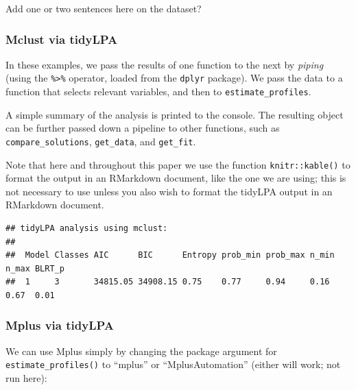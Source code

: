 \documentclass[man]{apa6}
\newenvironment{Shaded}{\begin{snugshade}}{\end{snugshade}}
\newcommand{\DecValTok}[1]{\textcolor[rgb]{0.00,0.00,0.81}{#1}}
\newcommand{\KeywordTok}[1]{\textcolor[rgb]{0.13,0.29,0.53}{\textbf{#1}}}
\newcommand{\NormalTok}[1]{#1}
\newcommand{\OperatorTok}[1]{\textcolor[rgb]{0.81,0.36,0.00}{\textbf{#1}}}
\newcommand{\StringTok}[1]{\textcolor[rgb]{0.31,0.60,0.02}{#1}}
\begin{document}
Add one or two sentences here on the dataset?

\hypertarget{mclust-via-tidylpa}{%
\subsubsection{Mclust via tidyLPA}\label{mclust-via-tidylpa}}

In these examples, we pass the results of one function to the next by \emph{piping}
(using the \texttt{\%\textgreater{}\%} operator, loaded from the \texttt{dplyr} package). We pass the data to
a function that selects relevant variables, and then to \texttt{estimate\_profiles}.

A simple summary of the analysis is printed to the console. The resulting object
can be further passed down a pipeline to other functions, such as
\texttt{compare\_solutions}, \texttt{get\_data}, and \texttt{get\_fit}.

Note that here and throughout this paper we use the function \texttt{knitr::kable()} to
format the output in an RMarkdown document, like the one we are using; this is
not necessary to use unless you also wish to format the tidyLPA output in an
RMarkdown document.

\begin{Shaded}
\end{Shaded}

\begin{verbatim}
## tidyLPA analysis using mclust: 
## 
##  Model Classes AIC      BIC      Entropy prob_min prob_max n_min n_max BLRT_p
##  1     3       34815.05 34908.15 0.75    0.77     0.94     0.16  0.67  0.01
\end{verbatim}

\hypertarget{mplus-via-tidylpa}{%
\subsubsection{Mplus via tidyLPA}\label{mplus-via-tidylpa}}

We can use Mplus simply by changing the package argument for
\texttt{estimate\_profiles()} to \enquote{mplus} or \enquote{MplusAutomation} (either will work; not run here):
\end{document}
